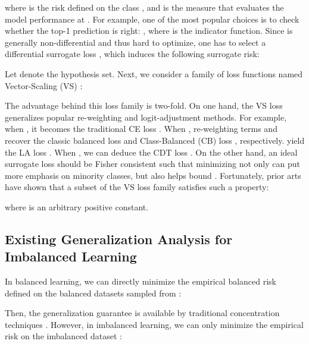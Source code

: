 where  is the risk defined on the class , and  is the measure that evaluates the model performance at . For example, one of the most popular choices is to check whether the top-1 prediction is right: ,
where  is the indicator function. Since  is generally non-differential and thus hard to optimize, one has to select a differential surrogate loss , which induces the following surrogate risk:

Let   denote the hypothesis set. Next, we consider a family of loss functions named Vector-Scaling (VS) \cite{DBLP:conf/nips/KiniPOT21}:

The advantage behind this loss family is two-fold. On one hand, the VS loss generalizes popular re-weighting and logit-adjustment methods. For example, when , it becomes the traditional CE loss \cite{10.5555/2371238}. When , re-weighting terms  and   recover the classic balanced loss \cite{DBLP:conf/icml/MorikBJ99} and Class-Balanced (CB) loss \cite{DBLP:conf/cvpr/CuiJLSB19}, respectively.  yield the LA loss \cite{DBLP:conf/iclr/MenonJRJVK21}. When , we can deduce the CDT loss \cite{DBLP:journals/corr/abs-2001-01385}. On the other hand, an ideal surrogate loss should be Fisher consistent such that minimizing  not only can put more emphasis on minority classes, but also helps bound  \cite{10.5555/2371238,DBLP:conf/icml/MenonNAC13}. Fortunately, prior arts \cite{DBLP:conf/iclr/MenonJRJVK21} have shown that a subset of the VS loss family satisfies such a property:

where  is an arbitrary positive constant.

\subsection{Existing Generalization Analysis for Imbalanced Learning}
\label{subsec:existing_analysis}
In balanced learning, we can directly minimize the empirical balanced risk defined on the balanced datasets  sampled from :

Then, the generalization guarantee is available by traditional concentration techniques \cite{10.5555/2371238}. However, in imbalanced learning, we can only minimize the empirical risk on the imbalanced dataset :

